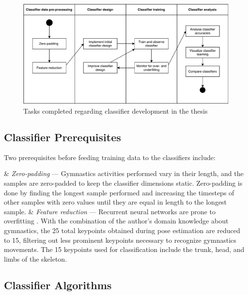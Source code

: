 \begin{figure}[htb]
  \centering
    \includegraphics[width=\textwidth,keepaspectratio]
    {images/classifier/classifier-tasks}
    \caption{Tasks completed regarding classifier development in the thesis}
    \label{classifier-tasks}
\end{figure}

\subsection{Classifier Prerequisites}

Two prerequisites before feeding training data to the classifiers include:

\begin{easylist}[itemize]

& \textit{Zero-padding} --- Gymnastics activities performed vary in their length, and the samples are zero-padded to keep the classifier dimensions static. Zero-padding is done by finding the longest sample performed and increasing the timesteps of other samples with zero values until they are equal in length to the longest sample.
& \textit{Feature reduction} --- Recurrent neural networks are prone to overfitting \cite{DBLP:journals/corr/ZarembaSV14}. With the combination of the author's domain knowledge about gymnastics, the 25 total keypoints obtained during pose estimation are reduced to 15, filtering out less prominent keypoints necessary to recognize gymnastics movements. The 15 keypoints used for classification include the trunk, head, and limbs of the skeleton.

\end{easylist}

\subsection{Classifier Algorithms}


